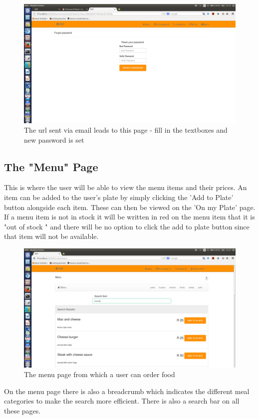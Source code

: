 \documentclass[a4paper,12pt]{article}
\begin{document}
\begin{figure}[H]
  \centering
    \includegraphics[width=1.0\textwidth]{screenshots/newPassForPass.png}
    \caption{The url sent via email leads to this page - fill in the textboxes and new password is set} 
\end{figure}


\subsection{The "Menu" Page} 
This is where the user will be able to view the menu items and their prices. An item can be added to the user's plate by simply clicking the 'Add to Plate' button alongside each item. These can then be viewed on the 'On my Plate' page.
If a menu item is not in stock it will be written in red on the menu item that it is "out of stock " and there will be no  option to click the add to plate button since that item will not be available. 
\\
\begin{figure}[H]
  \centering
    \includegraphics[width=1.0\textwidth]{screenshots/searchCheese.png}
    \caption{The menu page from which a user can order food} 
\end{figure}
On the menu page there is also a breadcrumb which indicates the different meal categories to make the search more efficient. There is also a search bar on all these pages. 
\end{document}
